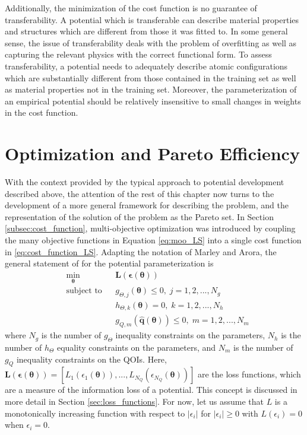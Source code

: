 Additionally, the minimization of the cost function is no guarantee of transferability.  A potential which is transferable can describe material properties and structures which are different from those it was fitted to.  In some general sense, the issue of transferability deals with the problem of overfitting as well as capturing the relevant physics with the correct functional form.  To assess transferability, a potential needs to adequately describe atomic configurations which are substantially different from those contained in the training set as well as material properties not in the training set.  Moreover, the parameterization of an empirical potential should be relatively insensitive to small changes in weights in the cost function\cite{martinez2013_fitting}.

\section{Optimization and Pareto Efficiency}

With the context provided by the typical approach to potential development described above, the attention of the rest of this chapter now turns to the development of a more general framework for describing the problem, and the representation of the solution of the problem as the Pareto set.  In Section \ref{subsec:cost_function}, multi-objective optimization was introduced by coupling the many objective functions in Equation \ref{eq:moo_LS} into a single cost function in \ref{eq:cost_function_LS}.  Adapting the notation of Marley and Arora\cite{marler2004_moo_survey}, the general statement of for the potential parameterization is
\begin{subequations}
	\label{eq:moo}
\begin{align}
  	&\min_{\bm{\theta}}
	    & & \bm{L}(\bm{\epsilon}(\bm{\theta})) \\
    &\text{subject to}
	    & & g_{\Theta,j}(\bm{\theta}) \leq 0,
			    \; j=1,2,...,N_g \\
	  & & & h_{\Theta,k}(\bm{\theta}) = 0,
		      \; k=1,2,...,N_h \\
	  & & & g_{Q,m}(\hat{\bm{q}}(\bm{\theta})) \leq 0,
		      \; m=1,2,...,N_m
\end{align}
\end{subequations}
where
$N_g$ is the number of $g_\Theta$ inequality constraints on the parameters,
$N_h$ is the number of $h_\Theta$ equality constraints on the parameters,
and $N_m$ is the number of $g_Q$ inequality constraints on the QOIs.
Here,
$
\bm{L}(\bm{\epsilon}(\bm{\theta}))
=
[
  L_1(\epsilon_1(\bm{\theta})),
	...,
	L_{N_Q}(\epsilon_{N_Q}(\bm{\theta}))
]
$ are the loss functions, which are a measure of the information loss of a potential.  This concept is discussed in more detail in Section \ref{sec:loss_functions}.  For now, let us assume that $L$ is a monotonically increasing function with respect to $|\epsilon_i|$ for $|\epsilon_i| \geq 0$ with $L(\epsilon_i)=0$ when $\epsilon_i=0$.

